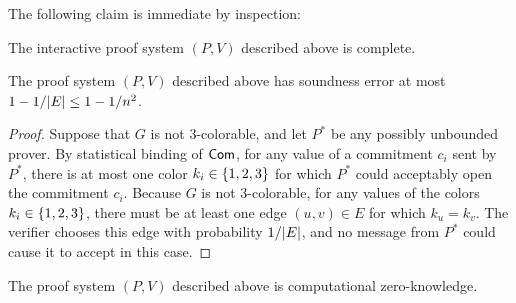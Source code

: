 \documentclass[11pt]{article}
\begin{document}
The following claim is immediate by inspection:

\begin{claim}
  \label{claim:complete}
  The interactive proof system $(P,V)$ described above is complete.
\end{claim}

\begin{claim}
  \label{claim:sound}
  The proof system $(P,V)$ described above has soundness error at most
  $1-1/\lvert E\rvert \leq 1-1/n^{2}$.
\end{claim}

\begin{proof}
  Suppose that $G$ is not $3$-colorable, and let $P^{*}$ be any
  possibly unbounded prover.  By statistical binding of $\mathsf{Com}$, for
  any value of a commitment $c_{i}$ sent by $P^{*}$, there is at most
  one color $k_{i} \in \{1,2,3\}$ for which $P^{*}$ could acceptably
  open the commitment $c_{i}$.  Because $G$ is not $3$-colorable, for
  any values of the colors $k_{i} \in \{1,2,3\}$, there must be at
  least one edge $(u,v) \in E$ for which $k_{u} = k_{v}$.  The
  verifier chooses this edge with probability $1/\lvert E\rvert$, and no
  message from $P^{*}$ could cause it to accept in this case.
\end{proof}

\begin{claim}
  \label{claim:zk}
  The proof system $(P,V)$ described above is computational
  zero-knowledge.
\end{claim}
\end{document}

